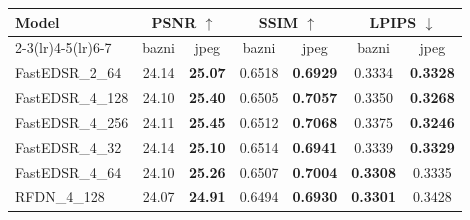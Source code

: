 \begin{tabular}{lcccccc}
\toprule
Model & \multicolumn{2}{c}{PSNR $\uparrow$} & \multicolumn{2}{c}{SSIM $\uparrow$} & \multicolumn{2}{c}{LPIPS $\downarrow$} \\
\cmidrule(lr){2-3}\cmidrule(lr){4-5}\cmidrule(lr){6-7}
 & bazni & jpeg & bazni & jpeg & bazni & jpeg \\
\midrule
FastEDSR\_2\_64 & 24.14 & \textbf{25.07} & 0.6518 & \textbf{0.6929} & 0.3334 & \textbf{0.3328} \\
FastEDSR\_4\_128 & 24.10 & \textbf{25.40} & 0.6505 & \textbf{0.7057} & 0.3350 & \textbf{0.3268} \\
FastEDSR\_4\_256 & 24.11 & \textbf{25.45} & 0.6512 & \textbf{0.7068} & 0.3375 & \textbf{0.3246} \\
FastEDSR\_4\_32 & 24.14 & \textbf{25.10} & 0.6514 & \textbf{0.6941} & 0.3339 & \textbf{0.3329} \\
FastEDSR\_4\_64 & 24.10 & \textbf{25.26} & 0.6507 & \textbf{0.7004} & \textbf{0.3308} & 0.3335 \\
RFDN\_4\_128 & 24.07 & \textbf{24.91} & 0.6494 & \textbf{0.6930} & \textbf{0.3301} & 0.3428 \\
\bottomrule
\end{tabular}